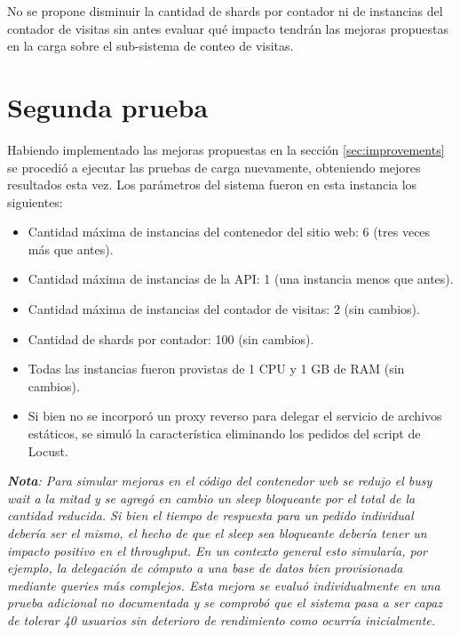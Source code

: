 \documentclass[11pt]{scrartcl}
\begin{document}
No se propone disminuir la cantidad de shards por contador ni de instancias del contador de visitas sin antes evaluar qué impacto tendrán las mejoras propuestas en la carga sobre el sub-sistema de conteo de visitas.

\section{Segunda prueba}\label{sec:test-2}

Habiendo implementado las mejoras propuestas en la sección \ref{sec:improvements} se procedió a ejecutar las pruebas de carga nuevamente, obteniendo mejores resultados esta vez. Los parámetros del sistema fueron en esta instancia los siguientes:
\begin{itemize}
\item Cantidad máxima de instancias del contenedor del sitio web: 6 (tres veces más que antes).
\item Cantidad máxima de instancias de la API: 1 (una instancia menos que antes).
\item Cantidad máxima de instancias del contador de visitas: 2 (sin cambios).
\item Cantidad de shards por contador: 100 (sin cambios).
\item Todas las instancias fueron provistas de 1 CPU y 1 GB de RAM (sin cambios).
\item Si bien no se incorporó un proxy reverso para delegar el servicio de archivos estáticos, se simuló la característica eliminando los pedidos del script de Locust.
\end{itemize}

\textit{\textbf{Nota}: Para simular mejoras en el código del contenedor web se redujo el busy wait a la mitad y se agregó en cambio un sleep bloqueante por el total de la cantidad reducida. Si bien el tiempo de respuesta para un pedido individual debería ser el mismo, el hecho de que el sleep sea bloqueante debería tener un impacto positivo en el throughput. En un contexto general esto simularía, por ejemplo, la delegación de cómputo a una base de datos bien provisionada mediante queries más complejos. Esta mejora se evaluó individualmente en una prueba adicional no documentada y se comprobó que el sistema pasa a ser capaz de tolerar 40 usuarios sin deterioro de rendimiento como ocurría inicialmente.}
\end{document}
